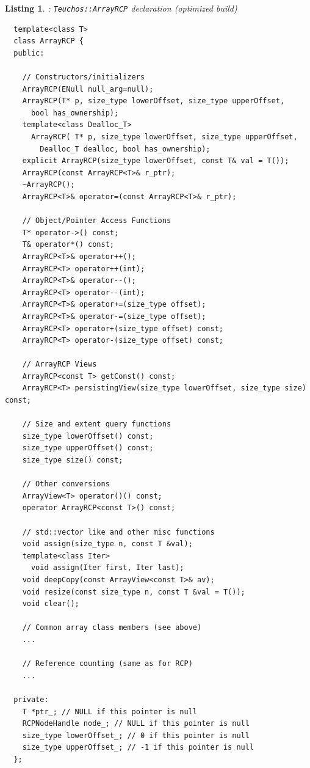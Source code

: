 \documentclass[pdf,ps2pdf,11pt]{SANDreport}
\newtheorem{listing}{Listing}
\begin{document}
\begin{listing}: {}\texttt{Teuchos::ArrayRCP} declaration (optimized build)\\
\label{listing:ArrayRCP}
{\small\begin{verbatim}
  template<class T>
  class ArrayRCP {
  public:
  
    // Constructors/initializers
    ArrayRCP(ENull null_arg=null);
    ArrayRCP(T* p, size_type lowerOffset, size_type upperOffset,
      bool has_ownership);
    template<class Dealloc_T>
      ArrayRCP( T* p, size_type lowerOffset, size_type upperOffset,
        Dealloc_T dealloc, bool has_ownership);
    explicit ArrayRCP(size_type lowerOffset, const T& val = T());
    ArrayRCP(const ArrayRCP<T>& r_ptr);
    ~ArrayRCP();
    ArrayRCP<T>& operator=(const ArrayRCP<T>& r_ptr);

    // Object/Pointer Access Functions 
    T* operator->() const;
    T& operator*() const;
    ArrayRCP<T>& operator++();
    ArrayRCP<T> operator++(int);
    ArrayRCP<T>& operator--();
    ArrayRCP<T> operator--(int);
    ArrayRCP<T>& operator+=(size_type offset);
    ArrayRCP<T>& operator-=(size_type offset);
    ArrayRCP<T> operator+(size_type offset) const;
    ArrayRCP<T> operator-(size_type offset) const;
  
    // ArrayRCP Views
    ArrayRCP<const T> getConst() const;
    ArrayRCP<T> persistingView(size_type lowerOffset, size_type size) const;
  
    // Size and extent query functions 
    size_type lowerOffset() const;
    size_type upperOffset() const;
    size_type size() const;
  
    // Other conversions
    ArrayView<T> operator()() const;
    operator ArrayRCP<const T>() const;
  
    // std::vector like and other misc functions
    void assign(size_type n, const T &val);
    template<class Iter>
      void assign(Iter first, Iter last);
    void deepCopy(const ArrayView<const T>& av);
    void resize(const size_type n, const T &val = T());
    void clear();

    // Common array class members (see above)
    ...
  
    // Reference counting (same as for RCP)
    ...
  
  private:
    T *ptr_; // NULL if this pointer is null
    RCPNodeHandle node_; // NULL if this pointer is null
    size_type lowerOffset_; // 0 if this pointer is null
    size_type upperOffset_; // -1 if this pointer is null
  };
  

\end{verbatim}}
\end{listing}
\end{document}
